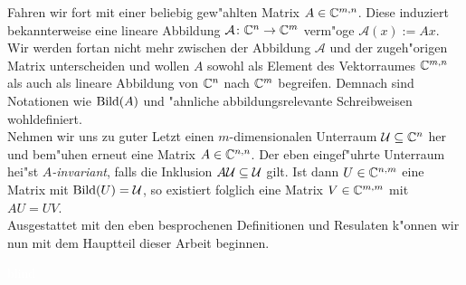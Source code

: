 Fahren wir fort mit einer beliebig gew"ahlten Matrix $A\in\mathbb{C}^{m,n}$. Diese induziert bekannterweise eine lineare Abbildung $\mathcal{A}\colon\mathbb{C}^n\to\mathbb{C}^{m}$ verm"oge $\mathcal{A}(x) := Ax$.
Wir werden fortan nicht mehr zwischen der Abbildung $\mathcal{A}$ und der zugeh"origen Matrix unterscheiden und wollen $A$ sowohl als Element des Vektorraumes $\mathbb{C}^{m,n}$
als auch als lineare Abbildung von $\mathbb{C}^n$ nach $\mathbb{C}^m$ begreifen. Demnach sind Notationen wie $\operatorname{Bild}(A)$ und "ahnliche abbildungsrelevante Schreibweisen wohldefiniert.\\

Nehmen wir uns zu guter Letzt einen $m$-dimensionalen Unterraum $\mathcal{U} \subseteq \mathbb{C}^n$ her und bem"uhen erneut eine Matrix $A\in\mathbb{C}^{n,n}$.
Der eben eingef"uhrte Unterraum hei"st \emph{$A$-invariant}, falls die Inklusion $A\mathcal{U}\subseteq\mathcal{U}$ gilt.
Ist dann $U\in\mathbb{C}^{n,m}$ eine Matrix mit $\operatorname{Bild}(U)=\mathcal{U}$, so existiert folglich eine Matrix $V\in\mathbb{C}^{m,m}$ mit $AU = UV$.\\

Ausgestattet mit den eben besprochenen Definitionen und Resulaten k"onnen wir nun mit dem Hauptteil dieser Arbeit beginnen.

\newpage
\textcolor{white}{blind}





